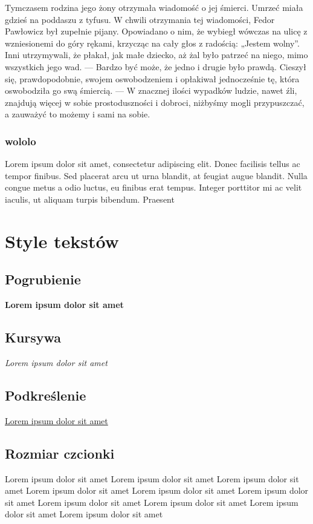 \documentclass{article}
\begin{document}
Tymczasem rodzina jego żony otrzymała wiadomość o jej śmierci. Umrzeć miała gdzieś na poddaszu z tyfusu. W chwili otrzymania tej wiadomości, Fedor Pawłowicz był zupełnie pijany. Opowiadano o nim, że wybiegł wówczas na ulicę z wzniesionemi do góry rękami, krzycząc na cały głos z radością: „Jestem wolny”. Inni utrzymywali, że płakał, jak małe dziecko, aż żal było patrzeć na niego, mimo wszystkich jego wad. — Bardzo być może, że jedno i drugie było prawdą. Cieszył się, prawdopodobnie, swojem oswobodzeniem i opłakiwał jednocześnie tę, która oswobodziła go swą śmiercią. — W znacznej ilości wypadków ludzie, nawet źli, znajdują więcej w sobie prostoduszności i dobroci, niżbyśmy mogli przypuszczać, a zauważyć to możemy i sami na sobie.



\subsubsection[short]{wololo}

Lorem ipsum dolor sit amet, consectetur adipiscing elit. Donec facilisis tellus ac tempor finibus. Sed placerat arcu ut urna blandit, at feugiat augue blandit. Nulla congue metus a odio luctus, eu finibus erat tempus. Integer porttitor mi ac velit iaculis, ut aliquam turpis bibendum. Praesent

\section{Style tekstów}

\subsection{Pogrubienie}
\textbf{Lorem ipsum dolor sit amet}
\subsection{Kursywa}
\textit{Lorem ipsum dolor sit amet}
\subsection{Podkreślenie}
\underline{Lorem ipsum dolor sit amet}
\subsection{Rozmiar czcionki}
{\tiny Lorem ipsum dolor sit amet}
{\scriptsize Lorem ipsum dolor sit amet}
{\footnotesize Lorem ipsum dolor sit amet}
{\small Lorem ipsum dolor sit amet}
{\normalsize Lorem ipsum dolor sit amet}
{\large Lorem ipsum dolor sit amet}
{\Large Lorem ipsum dolor sit amet}
{\LARGE Lorem ipsum dolor sit amet}
{\huge Lorem ipsum dolor sit amet}
{\Huge Lorem ipsum dolor sit amet}
\end{document}
